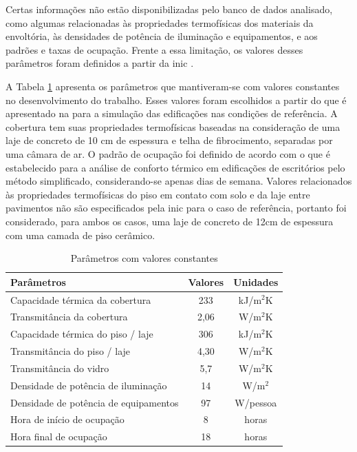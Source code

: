 Certas informações não estão disponibilizadas pelo banco de dados analisado, como algumas relacionadas às propriedades termofísicas dos materiais da envoltória, às densidades de potência de iluminação e equipamentos, e aos padrões e taxas de ocupação. Frente a essa limitação, os valores desses parâmetros foram definidos a partir da \acrlong{inic} \cite{INIC}. %

A Tabela \ref{table:paramconst} apresenta os parâmetros que mantiveram-se com valores constantes no desenvolvimento do trabalho. Esses valores foram escolhidos a partir do que é apresentado na  para a simulação das edificações nas condições de referência. A cobertura tem suas propriedades termofísicas baseadas na consideração de uma laje de concreto de 10 cm de espessura e telha de fibrocimento, separadas por uma câmara de ar. O padrão de ocupação foi definido de acordo com o que é estabelecido para a análise de conforto térmico em edificações de escritórios pelo método simplificado, considerando-se apenas dias de semana. Valores relacionados às propriedades termofísicas do piso em contato com solo e da laje entre pavimentos não são especificados pela \acrshort{inic} para o caso de referência, portanto foi considerado, para ambos os casos, uma laje de concreto de 12cm de espessura com uma camada de piso cerâmico.

\begin{table}[h]
	\centering
	\caption{Parâmetros com valores constantes}
	\label{table:paramconst}
	\begin{tabular}{|l |c |c |}
		\hline
		\textbf{Parâmetros} & \textbf{Valores} & \textbf{Unidades} \\
		\hline
		Capacidade térmica da cobertura & 233 & kJ/m$^2$K \\
		\hline
		Transmitância da cobertura & 2,06 & W/m$^2$K \\
		\hline
		Capacidade térmica do piso / laje & 306 & kJ/m$^2$K \\
		\hline
		Transmitância do piso / laje & 4,30 & W/m$^2$K \\
		\hline
		Transmitância do vidro & 5,7 & W/m$^2$K \\
		\hline 
		Densidade de potência de iluminação & 14 & W/m$^2$ \\
		\hline 
		Densidade de potência de equipamentos & 97 & W/pessoa \\
		\hline 
		Hora de início de ocupação & 8 & horas \\
		\hline 
		Hora final de ocupação & 18 & horas \\
		\hline 
	\end{tabular}
\end{table}

